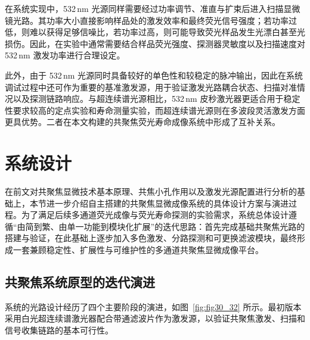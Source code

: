 在系统实现中，532\,nm 光源同样需要经过功率调节、准直与扩束后进入扫描显微镜光路。其功率大小直接影响样品处的激发效率和最终荧光信号强度；若功率过低，则难以获得足够信噪比，若功率过高，则可能导致荧光样品发生光漂白甚至光损伤。因此，在实验中通常需要结合样品荧光强度、探测器灵敏度以及扫描速度对 532\,nm 激发功率进行合理设定。

此外，由于 532\,nm 光源同时具备较好的单色性和较稳定的脉冲输出，因此在系统调试过程中还可作为重要的基准激发源，用于验证激发光路耦合状态、扫描对准情况以及探测链路响应。与超连续谱光源相比，532\,nm 皮秒激光器更适合用于稳定性要求较高的定点实验和寿命测量实验，而超连续谱光源则在多波段灵活激发方面更具优势。二者在本文构建的共聚焦荧光寿命成像系统中形成了互补关系。



\section{系统设计}\label{3.3}

在前文对共聚焦显微技术基本原理、共焦小孔作用以及激发光源配置进行分析的基础上，本节进一步介绍自主搭建的共聚焦显微成像系统的具体设计方案与演进过程。为了满足后续多通道荧光成像与荧光寿命探测的实验需求，系统总体设计遵循``由简到繁、由单一功能到模块化扩展''的迭代思路：首先完成基础共聚焦光路的搭建与验证，在此基础上逐步加入多色激发、分路探测和可更换滤波模块，最终形成一套兼顾稳定性、扩展性与可维护性的多通道共聚焦显微成像平台。



\subsection{共聚焦系统原型的迭代演进}

系统的光路设计经历了四个主要阶段的演进，如图~\ref{fig:fig30_32} 所示。最初版本采用白光超连续谱激光器配合带通滤波片作为激发源，以验证共聚焦激发、扫描和信号收集链路的基本可行性。

